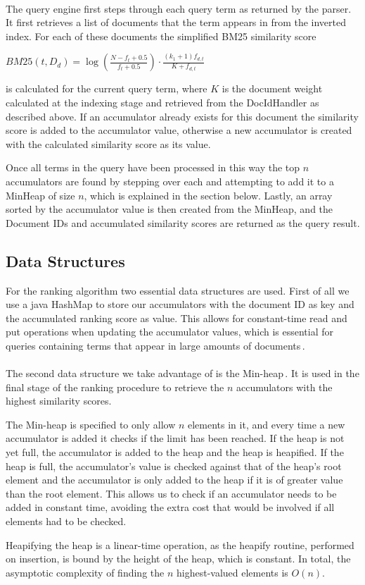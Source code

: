 \paragraph*{}
The query engine first steps through each query term as returned by the parser. It first retrieves a list of documents that the term appears in from the inverted index. For each of these documents the simplified BM25 similarity score\\
\begin{center}
$BM25(t, D_d) = \log \left( \frac{N - f_t + 0.5}{f_t + 0.5} \right) \cdot \frac{(k_1 + 1) f_{d,t}}{K + f_{d,t}}$\\
\end{center}
is calculated for the current query term, where $K$ is the document weight calculated at the indexing stage and retrieved from the DocIdHandler as described above.
If an accumulator already exists for this document the similarity score is added to the accumulator value, otherwise a new accumulator is created with the calculated similarity score as its value.

Once all terms in the query have been processed in this way the top $n$ accumulators are found by stepping over each and attempting to add it to a MinHeap of size $n$, which is explained in the section below. Lastly, an array sorted by the accumulator value is then created from the MinHeap, and the Document IDs and accumulated similarity scores are returned as the query result.

\subsection*{Data Structures}
For the ranking algorithm two essential data structures are used. First of all we use a java HashMap to store our accumulators with the document ID as key and the accumulated ranking score as value. This allows for constant-time read and put operations when updating the accumulator values, which is essential for queries containing terms that appear in large amounts of documents\,\cite{hashmap}.

\paragraph*{}
The second data structure we take advantage of is the Min-heap\,\cite{wolfram13}. It is used in the final stage of the ranking procedure to retrieve the $n$ accumulators with the highest similarity scores.

The Min-heap is specified to only allow $n$ elements in it, and every time a new accumulator is added it checks if the limit has been reached. If the heap is not yet full, the accumulator is added to the heap and the heap is heapified. If the heap is full, the accumulator's value is checked against that of the heap's root element and the accumulator is only added to the heap if it is of greater value than the root element. This allows us to check if an accumulator needs to be added in constant time, avoiding the extra cost that would be involved if all elements had to be checked.

Heapifying the heap is a linear-time operation, as the heapify routine, performed on insertion, is bound by the height of the heap, which is constant. In total, the asymptotic complexity of finding the $n$ highest-valued elements is $O(n)$.
